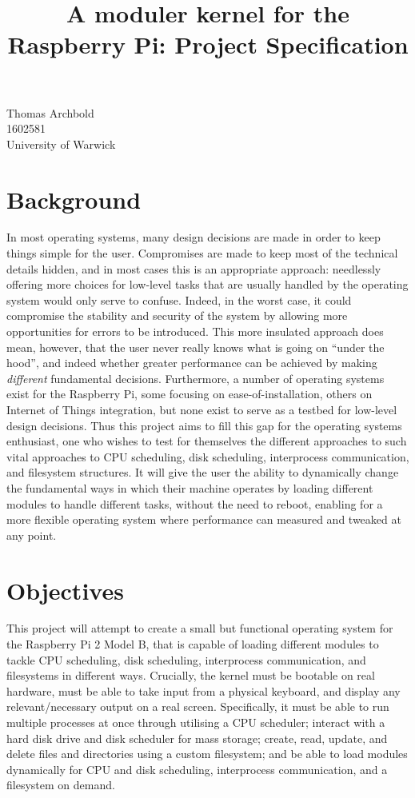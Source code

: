 \documentclass[10pt,a4paper]{article}
\title{A moduler kernel for the Raspberry Pi: Project Specification}
\begin{document}
\maketitle

\begin{center}
    Thomas Archbold \\
    1602581 \\
    University of Warwick \\
\end{center}

\section{Background}
In most operating systems, many design decisions are made in order to keep
things simple for the user. Compromises are made to keep most of the technical
details hidden, and in most cases this is an appropriate approach: needlessly
offering more choices for low-level tasks that are usually handled by the
operating system would only serve to confuse. Indeed, in the worst case, it
could compromise the stability and security of the system by allowing more
opportunities for errors to be introduced.  This more insulated approach does
mean, however, that the user never really knows what is going on ``under the
hood'', and indeed whether greater performance can be achieved by making
\textit{different} fundamental decisions.  Furthermore, a number of operating
systems exist for the Raspberry Pi, some focusing on ease-of-installation,
others on Internet of Things integration, but none exist to serve as a testbed
for low-level design decisions. Thus this project aims to fill this gap for the
operating systems enthusiast, one who wishes to test for themselves the
different approaches to such vital approaches to CPU scheduling, disk
scheduling, interprocess communication, and filesystem structures. It will give
the user the ability to dynamically change the fundamental ways in which their
machine operates by loading different modules to handle different tasks, without
the need to reboot, enabling for a more flexible operating system where
performance can measured and tweaked at any point.

\section{Objectives}
This project will attempt to create a small but functional operating system for
the Raspberry Pi 2 Model B, that is capable of loading different modules to
tackle CPU scheduling, disk scheduling, interprocess communication, and
filesystems in different ways. Crucially, the kernel must be bootable on real
hardware, must be able to take input from a physical keyboard, and display any
relevant/necessary output on a real screen. Specifically, it must be able to run
multiple processes at once through utilising a CPU scheduler; interact with a
hard disk drive and disk scheduler for mass storage; create, read, update, and
delete files and directories using a custom filesystem; and be able to load
modules dynamically for CPU and disk scheduling, interprocess communication, and
a filesystem on demand.
\end{document}
